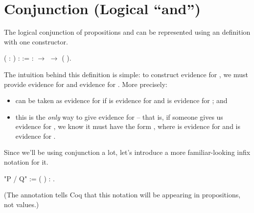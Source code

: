 \documentclass[12pt]{report}
\begin{document}
\section{Conjunction (Logical ``and'')}



 The logical conjunction of propositions  and  can be
    represented using an  definition with one
    constructor. \begin{coqdoccode}
\coqdocemptyline
\coqdocnoindent
{}  (  : ) :  :=\coqdoceol
\coqdocindent{1.00em}
 :  \ensuremath{\rightarrow}  \ensuremath{\rightarrow} (  ).\coqdoceol
\coqdocemptyline
\end{coqdoccode}
The intuition behind this definition is simple: to
    construct evidence for   , we must provide evidence
    for  and evidence for .  More precisely:



\begin{itemize}
\item  {}   can be taken as evidence for    if 
      is evidence for  and  is evidence for ; and



\item  this is the \textit{only} way to give evidence for    --
      that is, if someone gives us evidence for   , we
      know it must have the form   , where  is
      evidence for  and  is evidence for . 

\end{itemize}


   Since we'll be using conjunction a lot, let's introduce a more
   familiar-looking infix notation for it. \begin{coqdoccode}
\coqdocemptyline
\coqdocnoindent
{} "P / Q" := (  ) : .\coqdoceol
\coqdocemptyline
\end{coqdoccode}
(The  annotation tells Coq that this notation
    will be appearing in propositions, not values.) 
\end{document}
